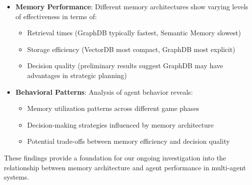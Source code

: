 \begin{itemize}
    \item \textbf{Memory Performance}: Different memory architectures show varying levels of effectiveness in terms of:
    \begin{itemize}
        \item Retrieval times (GraphDB typically fastest, Semantic Memory slowest)
        \item Storage efficiency (VectorDB most compact, GraphDB most explicit)
        \item Decision quality (preliminary results suggest GraphDB may have advantages in strategic planning)
    \end{itemize}
    
    \item \textbf{Behavioral Patterns}: Analysis of agent behavior reveals:
    \begin{itemize}
        \item Memory utilization patterns across different game phases
        \item Decision-making strategies influenced by memory architecture
        \item Potential trade-offs between memory efficiency and decision quality
    \end{itemize}
\end{itemize}

These findings provide a foundation for our ongoing investigation into the relationship between memory architecture and agent performance in multi-agent systems. 